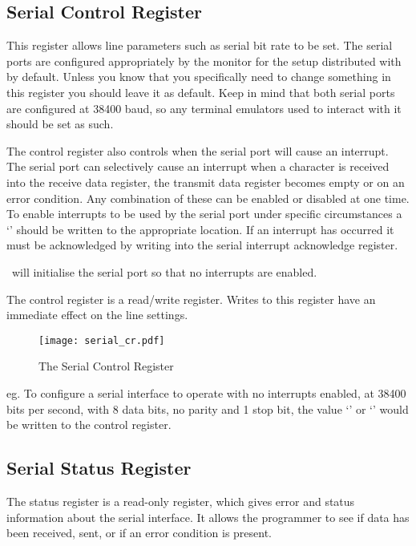 \newpage
\subsection{Serial Control Register}

This register allows line parameters such as serial bit rate to be
set. The serial ports are configured appropriately by the monitor for
the setup distributed with  by default. Unless you know
that you specifically need to change something in this register you
should leave it as default. Keep in mind that both serial ports
are configured at 38400 baud, so any terminal emulators used to interact
with it should be set as such.

The control register also controls when the serial port will cause an
interrupt. The serial port can selectively cause an interrupt when a
character is received into the receive data register, the transmit
data register becomes empty or on an error condition. Any combination of
these can be enabled or disabled at one time. To enable interrupts to
be used by the serial port under specific circumstances a `'
should be written to the appropriate location. If an interrupt has
occurred it must be acknowledged by writing into the serial interrupt
acknowledge register.

\WRAMPmon\ will initialise the serial port so that no
interrupts are enabled.

The control register is a read/write register. Writes to this register
have an immediate effect on the line settings.

\begin{figure}[h]
\begin{center}
\texttt{[image: serial\_cr.pdf]}
\caption{The Serial Control Register}
\label{serial_cr_pic}
\end{center}
\end{figure}

\noindent
eg. To configure a serial interface to operate with no interrupts
enabled, at 38400 bits per second, with 8 data bits, no parity and 1
stop bit, the value `' or `' would be
written to the control register.

\subsection{Serial Status Register}

The status register is a read-only register, which gives error and
status information about the serial interface. It allows the
programmer to see if data has been received, sent, or if an error
condition is present.

